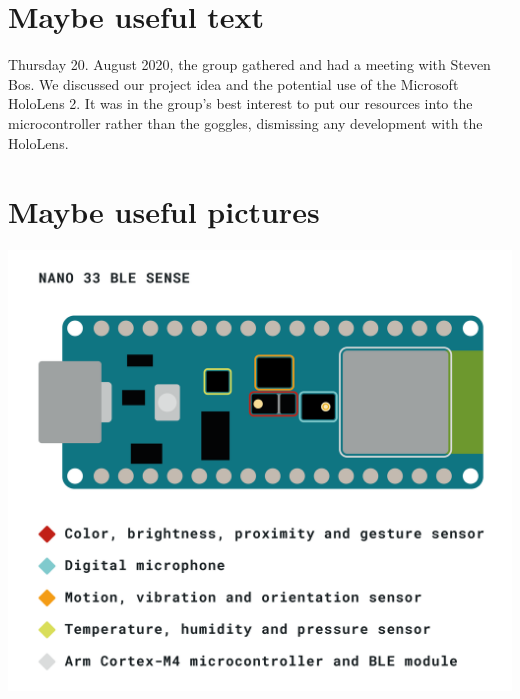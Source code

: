 \documentclass{article}
\begin{document}
\maketitle

\section{Maybe useful text}

Thursday 20. August 2020, the group gathered and had a meeting with Steven Bos. We discussed our project idea and the potential use of the Microsoft HoloLens 2. It was in the group's best interest to put our resources into the microcontroller rather than the goggles, dismissing any development with the HoloLens.

\section{Maybe useful pictures}

\includegraphics[width=\linewidth]{img/NANO-33-BLE-Sense_sensor-indentification.png}
\end{document}
